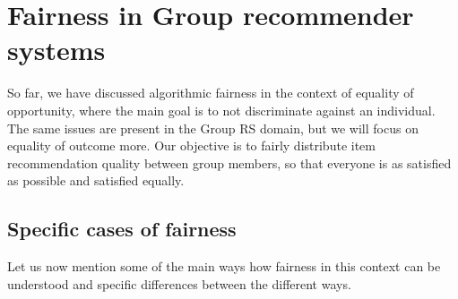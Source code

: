 

\section{Fairness in Group recommender systems} \label{sec:02_fairness_in_grs}



So far, we have discussed algorithmic fairness in the context of equality of opportunity, where the main goal is to not discriminate against an individual. The same issues are present in the Group RS domain, but we will focus on equality of outcome more. Our objective is to fairly distribute item recommendation quality between group members, so that everyone is as satisfied as possible and satisfied equally.


\subsection{Specific cases of fairness}
Let us now mention some of the main ways how fairness in this context can be understood and specific differences between the different ways.

